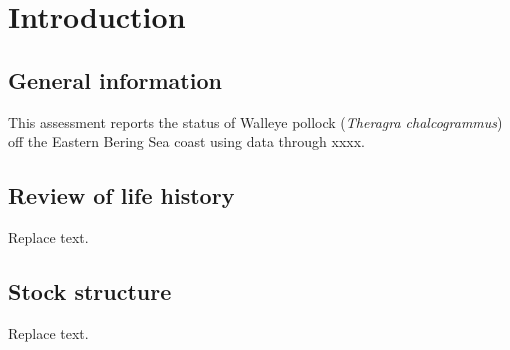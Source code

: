 \documentclass[11pt,
  english,
  a4paper,
]{article}
\begin{document}

\hypertarget{introduction}{%
\section{Introduction}\label{introduction}}

\leavevmode\tagmcend\tagstructend


\hypertarget{general-information}{%
\subsection{General information}\label{general-information}}

\leavevmode\tagmcend\tagstructend


This assessment reports the status of Walleye pollock (\emph{Theragra chalcogrammus}) off the Eastern Bering Sea coast using data through xxxx.

\leavevmode\tagmcend\tagstructend\par


\hypertarget{review-of-life-history}{%
\subsection{Review of life history}\label{review-of-life-history}}

\leavevmode\tagmcend\tagstructend


Replace text.

\leavevmode\tagmcend\tagstructend\par


\hypertarget{stock-structure}{%
\subsection{Stock structure}\label{stock-structure}}

\leavevmode\tagmcend\tagstructend


Replace text.

\leavevmode\tagmcend\tagstructend\par
\end{document}
